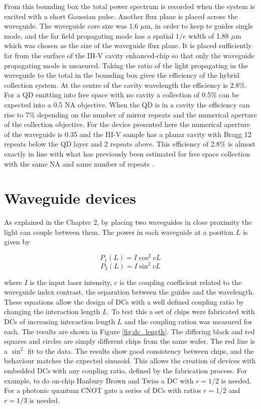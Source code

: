 From this bounding box the total power spectrum is recorded when the system is
excited with a short Gaussian pulse. Another flux plane is placed across the
waveguide. The waveguide core size was 1.6 $\mu \mathrm{m}$, in order to keep te
guides single mode, and the far field propagating mode has a spatial $1/e$ width
of 1.88 $\mu \mathrm{m}$ which was chosen as the size of the waveguide flux
plane. It is placed sufficiently far from the surface of the III-V cavity
enhanced-chip so that only the waveguide propagating mode is measured. Taking
the ratio of the light propagating in the waveguide to the total in the bounding
box gives the efficiency of the hybrid collection system. At the centre of the
cavity wavelength the efficiency is 2.8\%. For a QD emitting into free space
with no cavity a collection of 0.5\% can be expected into a 0.5 NA objective.
When the QD is in a cavity the efficiency can rise to 7\% depending on the
number of mirror repeats and the numerical aperture of the collection objective.
For the device presented here the numerical aperture of the waveguide is 0.35
and the III-V sample has a planar cavity with Bragg 12 repeats below the QD
layer and 2 repeats above. This efficiency of 2.8\% is almost exactly in line
with what has previously been estimated for free space collection with the same
NA and same number of repeats \cite{bennett2006single}.

\section{Waveguide devices}

\label{sec:wg_devices} As explained in the Chapter 2, by placing two waveguides
in close proximity the light can couple between them. The power in each
waveguide at a position $L$ is given by

\begin{equation} P_1(L) = I \cos^2 cL \end{equation} \begin{equation} P_2(L) = I
\sin^2 cL \end{equation}

where $I$ is the input laser intensity, $c$ is the coupling coefficient related
to the waveguide index contrast, the separation between the guides and the
wavelength. These equations allow the design of DCs with a well defined coupling
ratio by changing the interaction length $L$. To test this a set of chips were
fabricated with DCs of increasing interaction length $L$ and the coupling ration
was measured for each. The results are shown in Figure \ref{fig:dc_length}. The
differing black and red squares and circles are simply different chips from the
same wafer. The red line is a $\sin^2$ fit to the data. The results show good
consistency between chips, and the behaviour matches the expected sinusoid. This
allows the creation of devices with embedded DCs with any coupling ratio,
defined by the fabrication process. For example, to do on-chip Hanbury Brown and
Twiss a DC with $r = 1/2$ is needed. For a photonic quantum CNOT gate a series
of DCs with ratios $r = 1/2$ and $r = 1/3$ is needed.

